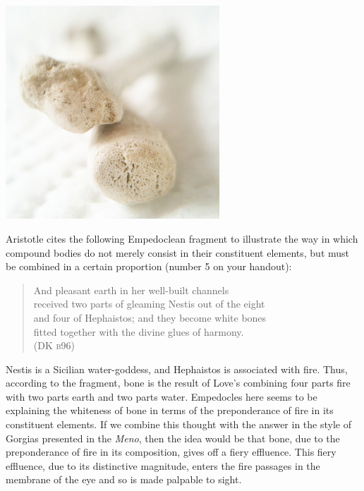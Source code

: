 \begin{frame}
	\begin{center}
		\includegraphics[height=8cm]{../../graphics/bone.jpg}
	\end{center}
\end{frame}

Aristotle cites the following Empedoclean fragment to illustrate the way in which compound bodies do not merely consist in their constituent elements, but must be combined in a certain proportion (number 5 on your handout):
\begin{verse}
    And pleasant earth in her well-built channels\\
    received two parts of gleaming Nestis out of the eight\\
    and four of Hephaistos; and they become white bones\\
    fitted together with the divine glues of harmony.\\
    (DK \textsc{b}96)
\end{verse}
Nestis is a Sicilian water-goddess, and Hephaistos is associated with fire. Thus, according to the fragment, bone is the result of Love's combining four parts fire with two parts earth and two parts water. Empedocles here seems to be explaining the whiteness of bone in terms of the preponderance of fire in its constituent elements. If we combine this thought with the answer in the style of Gorgias presented in the \emph{Meno}, then the idea would be that bone, due to the preponderance of fire in its composition, gives off a fiery effluence. This fiery effluence, due to its distinctive magnitude, enters the fire passages in the membrane of the eye and so is made palpable to sight. \change

